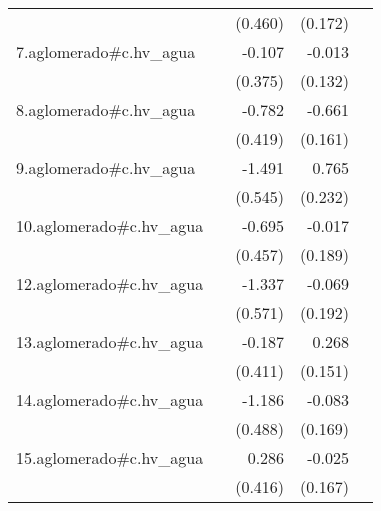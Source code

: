 {\begin{longtable}{l*{4}{D{.}{.}{-1}}}
            &                     &     (0.460)         &     (0.172)         &                     \\
\addlinespace
7.aglomerado#c.hv\_agua&                     &      -0.107         &      -0.013         &                     \\
            &                     &     (0.375)         &     (0.132)         &                     \\
\addlinespace
8.aglomerado#c.hv\_agua&                     &      -0.782         &      -0.661\sym{***}&                     \\
            &                     &     (0.419)         &     (0.161)         &                     \\
\addlinespace
9.aglomerado#c.hv\_agua&                     &      -1.491\sym{**} &       0.765\sym{***}&                     \\
            &                     &     (0.545)         &     (0.232)         &                     \\
\addlinespace
10.aglomerado#c.hv\_agua&                     &      -0.695         &      -0.017         &                     \\
            &                     &     (0.457)         &     (0.189)         &                     \\
\addlinespace
12.aglomerado#c.hv\_agua&                     &      -1.337\sym{*}  &      -0.069         &                     \\
            &                     &     (0.571)         &     (0.192)         &                     \\
\addlinespace
13.aglomerado#c.hv\_agua&                     &      -0.187         &       0.268         &                     \\
            &                     &     (0.411)         &     (0.151)         &                     \\
\addlinespace
14.aglomerado#c.hv\_agua&                     &      -1.186\sym{*}  &      -0.083         &                     \\
            &                     &     (0.488)         &     (0.169)         &                     \\
\addlinespace
15.aglomerado#c.hv\_agua&                     &       0.286         &      -0.025         &                     \\
            &                     &     (0.416)         &     (0.167)         &                     \\

\end{longtable}}
